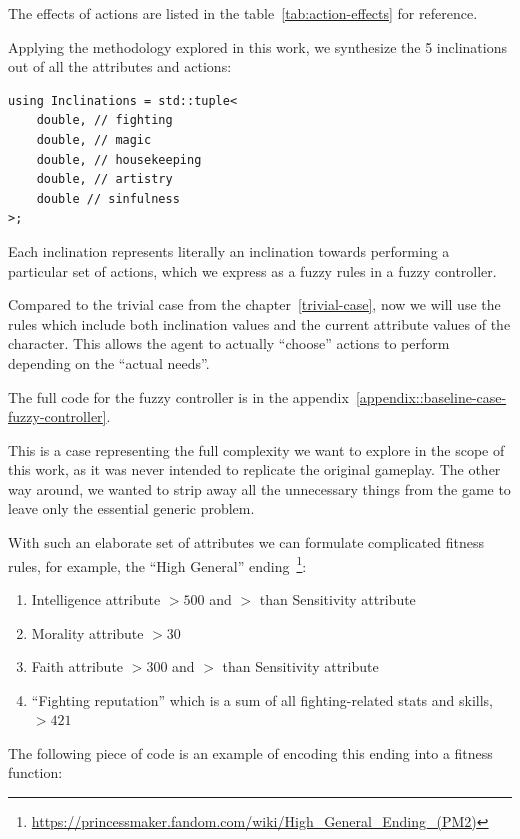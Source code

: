 \documentclass[12pt, a4paper]{report}
\begin{document}
	The effects of actions are listed in the table~\ref{tab:action-effects} for reference.
	
	Applying the methodology explored in this work, we synthesize the 5 inclinations out of all the attributes and actions:
	
	\begin{lstlisting}
using Inclinations = std::tuple<
	double, // fighting
	double, // magic
	double, // housekeeping
	double, // artistry
	double // sinfulness
>;
	\end{lstlisting}
	
	Each inclination represents literally an inclination towards performing a particular set of actions, which we express as a fuzzy rules in a fuzzy controller.
	
	Compared to the trivial case from the chapter~\ref{trivial-case}, now we will use the rules which include both inclination values and the current attribute values of the character.
	This allows the agent to actually ``choose'' actions to perform depending on the ``actual needs''.
	
	The full code for the fuzzy controller is in the appendix~\ref{appendix::baseline-case-fuzzy-controller}.

	This is a case representing the full complexity we want to explore in the scope of this work, as it was never intended to replicate the original gameplay.
	The other way around, we wanted to strip away all the unnecessary things from the game to leave only the essential generic problem.
	
	With such an elaborate set of attributes we can formulate complicated fitness rules, for example, the ``High General'' ending~\footnote{\url{https://princessmaker.fandom.com/wiki/High_General_Ending_(PM2)}}:
	
	\begin{enumerate}
		\item Intelligence attribute $> 500$ and $>$ than Sensitivity attribute
		\item Morality attribute $> 30$
		\item Faith attribute $> 300$ and $>$ than Sensitivity attribute
		\item ``Fighting reputation'' which is a sum of all fighting-related stats and skills, $> 421$
	\end{enumerate}
	
The following piece of code is an example of encoding this ending into a fitness function:
\end{document}
